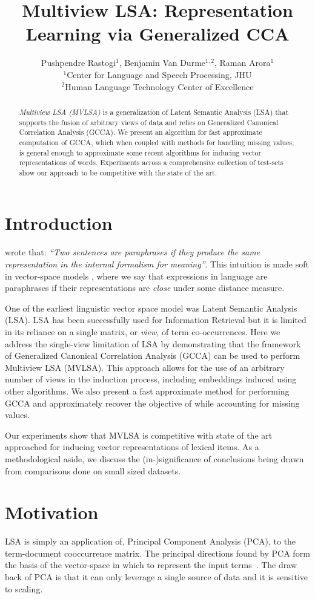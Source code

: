 \documentclass[11pt]{article}
\title{Multiview LSA: Representation Learning via Generalized CCA}
\author{{Pushpendre Rastogi$^1$, Benjamin Van Durme$^{1,2}$, Raman Arora$^{1}$}\\
  {$^1$Center for Language and Speech Processing, JHU}\\
  {$^2$Human Language Technology Center of Excellence}
}
\date{}
\begin{document}
\maketitle
\begin{abstract}
  \emph{Multiview LSA (MVLSA)} is a generalization of Latent Semantic
  Analysis (LSA) that supports the  
  fusion of arbitrary views of data and relies on Generalized Canonical Correlation
  Analysis (GCCA). We present an algorithm
  for fast approximate computation of GCCA, which when coupled with methods
  for handling missing values, is general enough to approximate
  some recent algorithms for inducing vector representations of
  words. Experiments across a comprehensive 
  collection of test-sets show our approach to be competitive with the
  state of the art.   
\end{abstract}

\section{Introduction}
 wrote that: \emph{``Two sentences
  are paraphrases if they produce the same representation in the
  internal formalism for meaning''}.  This intuition is made soft in
vector-space models \cite{turney2010frequency}, where we say that
expressions in language are paraphrases if
their representations are \emph{close} under some distance measure.

One of the earliest linguistic vector space model was Latent
Semantic Analysis (LSA). LSA has been successfully used 
for Information Retrieval but it is limited in its
reliance on a single matrix, or \emph{view}, of term co-occurrences.
Here we address the single-view limitation of LSA by demonstrating
that the framework of Generalized Canonical Correlation Analysis
(GCCA) can be used to perform Multiview LSA (MVLSA). This
approach allows for the use of an arbitrary number of views in the
induction process, including embeddings induced using other
algorithms. We also present a fast approximate method for performing
GCCA and approximately recover the objective of
\cite{pennington2014glove} while accounting for missing values. 

Our experiments show that MVLSA is competitive with state of the art
approached for inducing vector representations of lexical items.
As a methodological aside, we discuss the (in-)significance of
conclusions being drawn from comparisons done on small sized datasets.

\section{Motivation} 
LSA is simply an application of, Principal Component Analysis (PCA), to the
term-document cooccurrence matrix.  
The principal directions found by PCA form the basis of the
vector-space in which to represent the input
terms~\cite{landauer1997solution}. The draw back of PCA is that it can
only leverage a single source of data and it is sensitive to scaling.
\end{document}
